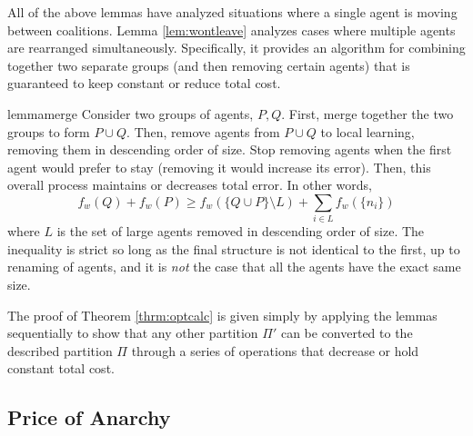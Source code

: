 \documentclass{article}
\newcommand{\ndraw}[0]{\ensuremath{n}}
\newcommand{\costw}[0]{\ensuremath{f_w}}
\newcommand{\partition}[0]{\ensuremath{\Pi}}
\begin{document}
All of the above lemmas have analyzed situations where a single agent is moving between coalitions. Lemma \ref{lem:wontleave} analyzes cases where multiple agents are rearranged simultaneously. Specifically, it provides an algorithm for combining together two separate groups (and then removing certain agents) that is guaranteed to keep constant or reduce total cost.

\begin{restatable}[Merging]{lemma}{merge}
\label{lem:merge}
Consider two groups of agents, $P, Q$. First, merge together the two groups to form $P \cup Q$. Then, remove agents from $P\cup Q$ to local learning, removing them in descending order of size. Stop removing agents when the first agent would prefer to stay (removing it would increase its error). Then, this overall process maintains or decreases total error. 
In other words, 
\begin{equation}\label{eq:submod0}
\costw(Q) + \costw(P) \geq \costw(\{Q\cup P\}\setminus L) + \sum_{i \in L}\costw(\{\ndraw_i\})
\end{equation}
where $L$ is the set of large agents removed in descending order of size. The inequality is strict so long as the final structure is not identical to the first, up to renaming of agents, and it is \emph{not} the case that all the agents have the exact same size. 
\end{restatable}

The proof of Theorem \ref{thrm:optcalc} is given simply by applying the lemmas sequentially to show that any other partition $\partition'$ can be converted to the described partition $\partition$ through a series of operations that decrease or hold constant total cost. 

\subsection{Price of Anarchy}\label{sec:PoA}
\end{document}
